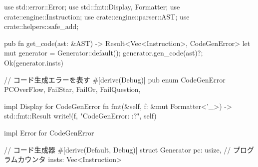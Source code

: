 use std::error::Error;
use std::fmt::{Display, Formatter};
use crate::engine::Instruction;
use crate::engine::parser::AST;
use crate::helpers::safe_add;

pub fn get_code(ast: &AST) -> Result<Vec<Instruction>, CodeGenError> {
    let mut generator = Generator::default();
    generator.gen_code(ast)?;
    Ok(generator.insts)
}

// コード生成エラーを表す
#[derive(Debug)]
pub enum CodeGenError {
    PCOverFlow,
    FailStar,
    FailOr,
    FailQuestion,
}

impl Display for CodeGenError {
    fn fmt(&self, f: &mut Formatter<'_>) -> std::fmt::Result {
        write!(f, "CodeGenError: {:?}", self)
    }
}

impl Error for CodeGenError{}


// コード生成器
#[derive(Default, Debug)]
struct Generator {
    pc: usize, // プログラムカウンタ
    insts: Vec<Instruction>
}


